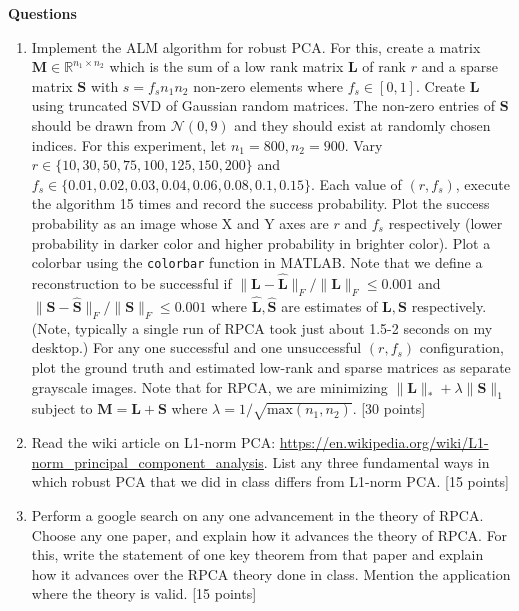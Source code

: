\documentclass[11pt]{article}
\begin{document}
\newpage
\noindent\textbf{Questions}
\begin{enumerate}
\item Implement the ALM algorithm for robust PCA. For this, create a matrix $\boldsymbol{M} \in \mathbb{R}^{n_1 \times n_2}$ which is the sum of a low rank matrix $\boldsymbol{L}$ of rank $r$ and a sparse matrix $\boldsymbol{S}$ with $s = f_s n_1 n_2$ non-zero elements where $f_s \in [0,1]$. Create $\boldsymbol{L}$ using truncated SVD of Gaussian random matrices. The non-zero entries of $\boldsymbol{S}$ should be drawn from $\mathcal{N}(0,9)$ and they should exist at randomly chosen indices. For this experiment, let $n_1 = 800, n_2 = 900$. Vary $r \in \{10,30,50,75,100,125,150,200\}$ and $f_s \in \{0.01, 0.02, 0.03, 0.04, 0.06, 0.08, 0.1, 0.15\}$. Each value of $(r,f_s)$, execute the algorithm 15 times and record the success probability. Plot the success probability as an image whose X and Y axes are $r$ and $f_s$ respectively (lower probability in darker color and higher probability in brighter color). Plot a colorbar using the \texttt{colorbar} function in MATLAB. Note that we define a reconstruction to be successful if $\|\boldsymbol{L}-\boldsymbol{\hat{L}}\|_F/\|\boldsymbol{L}\|_F \leq 0.001$ and $\|\boldsymbol{S}-\boldsymbol{\hat{S}}\|_F/\|\boldsymbol{S}\|_F \leq 0.001$ where $\boldsymbol{\hat{L}}, \boldsymbol{\hat{S}}$ are estimates of $\boldsymbol{L}, \boldsymbol{S}$ respectively. (Note, typically a single run of RPCA took just about 1.5-2 seconds on my desktop.) For any one successful and one unsuccessful $(r,f_s)$ configuration, plot the ground truth and estimated low-rank and sparse matrices as separate grayscale images. Note that
for RPCA, we are minimizing $\|\boldsymbol{L}\|_{*} + \lambda \|\boldsymbol{S}\|_1$ subject to $\boldsymbol{M} = \boldsymbol{L} + \boldsymbol{S}$ where $\lambda = 1/\sqrt{\text{max}(n_1,n_2)}$.
\textsf{[30 points]}

\item Read the wiki article on L1-norm PCA: \url{https://en.wikipedia.org/wiki/L1-norm_principal_component_analysis}. List any three fundamental ways in which robust PCA that we did in class differs from L1-norm PCA. \textsf{[15 points]}

\item Perform a google search on any one advancement in the theory of RPCA. Choose any one paper, and explain how it advances the theory of RPCA. For this, write the statement of one key theorem from that paper and explain how it advances over the RPCA theory done in class. Mention the application where the theory is valid. \textsf{[15 points]}


\end{enumerate}
\end{document}
